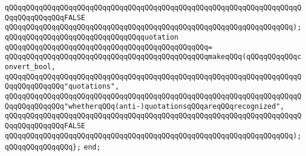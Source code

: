 \verb|qQQqqQQqqQQqqQQqqQQqqQQqqQQqqQQqqQQqqQQqqQQqqQQqqQQqqQQqqQQqqQQqqQQqqQQqqQQqqQQqqQQqFALSE|\newline
\verb|qQQqqQQqqQQqqQQqqQQqqQQqqQQqqQQqqQQqqQQqqQQqqQQqqQQqqQQqqQQqqQQqqQQq);|\newline
\newline
\verb|qQQqqQQqqQQqqQQqqQQqqQQqqQQqqQQqquotation|\newline
\verb|qQQqqQQqqQQqqQQqqQQqqQQqqQQqqQQqqQQqqQQqqQQqqQQq=|\newline
\verb|qQQqqQQqqQQqqQQqqQQqqQQqqQQqqQQqqQQqqQQqqQQqqQQqmakeqQQq(qQQqqQQqqQQqconvert_bool,|\newline
\verb|qQQqqQQqqQQqqQQqqQQqqQQqqQQqqQQqqQQqqQQqqQQqqQQqqQQqqQQqqQQqqQQqqQQqqQQqqQQqqQQqqQQq"quotations",|\newline
\verb|qQQqqQQqqQQqqQQqqQQqqQQqqQQqqQQqqQQqqQQqqQQqqQQqqQQqqQQqqQQqqQQqqQQqqQQqqQQqqQQqqQQq"whetherqQQq(anti-)quotationsqQQqareqQQqrecognized",|\newline
\verb|qQQqqQQqqQQqqQQqqQQqqQQqqQQqqQQqqQQqqQQqqQQqqQQqqQQqqQQqqQQqqQQqqQQqqQQqqQQqqQQqqQQqFALSE|\newline
\verb|qQQqqQQqqQQqqQQqqQQqqQQqqQQqqQQqqQQqqQQqqQQqqQQqqQQqqQQqqQQqqQQqqQQq);|\newline
\verb|qQQqqQQqqQQqqQQq};|\newline
\verb|end;|\newline
\newline

